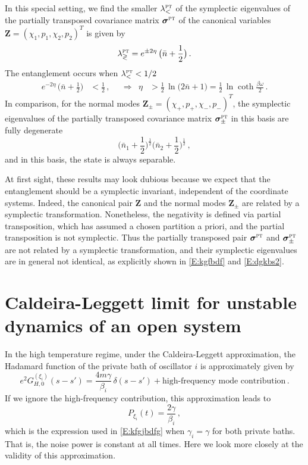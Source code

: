 \documentclass[11pt,a4paper]{article}
\begin{document}
In this special setting, we find the smaller $\lambda^{\textsc{pt}}_{<}$ of the symplectic eigenvalues of the partially transposed covariance matrix $\bm{\sigma}^{\textsc{pt}}$ of the canonical variables $\bm{Z}=(\chi_{1}, p_{1}, \chi_{2}, p_{2})^{T}$ is given by
\begin{equation}\label{E:kgfbdf}
	\lambda^{\textsc{pt}}_{\gtrless}=e^{\pm2\eta}\,\bigl(\bar{n}+\frac{1}{2}\bigr)\,.
\end{equation}
The entanglement occurs when $\lambda^{\textsc{pt}}_{<}<1/2$
\begin{align}
	e^{-2\eta}\,\bigl(\bar{n}+\frac{1}{2}\bigr)&<\frac{1}{2}\,,&&\Rightarrow&\eta&>\frac{1}{2}\,\ln\bigl(2\bar{n}+1\bigr)=\frac{1}{2}\,\ln\coth\frac{\beta\omega}{2}\,.
\end{align}
In comparison, for the normal modes $\bm{Z}_{\pm}=(\chi_{+}, p_{+}, \chi_{-}, p_{-})^{T}$, the symplectic eigenvalues of the partially transposed covariance matrix $\bm{\sigma}_{\pm}^{\textsc{pt}}$ in this basis are fully degenerate
\begin{equation}\label{E:dgkbs2}
	\bigl(\bar{n}_{1}+\frac{1}{2}\bigr)^{\frac{1}{2}}\bigl(\bar{n}_{2}+\frac{1}{2}\bigr)^{\frac{1}{2}}\,,
\end{equation}
and in this basis, the state is always separable.

At first sight, these results may look dubious because we expect that the entanglement should be a symplectic invariant, independent of the coordinate systems. Indeed, the canonical pair $\bm{Z}$ and the normal modes $\bm{Z}_\pm$ are related by a symplectic transformation. Nonetheless, the negativity is defined via partial transposition, which has assumed a chosen partition a priori, and the partial transposition is not symplectic. Thus the partially transposed pair $\bm{\sigma}^{\textsc{pt}}$ and $\bm{\sigma}_{\pm}^{\textsc{pt}}$ are not related by a symplectic transformation, and their symplectic eigenvalues are in general not identical, as explicitly shown in \eqref{E:kgfbdf} and \eqref{E:dgkbs2}. 



\section{Caldeira-Leggett limit for unstable dynamics of an open system}\label{S:gbdghf}


In the high temperature regime, {under} the Caldeira-Leggett approximation, the Hadamard function of the private bath of oscillator $i$ is approximately given by
\begin{equation}
	e^{2}G_{H,0}^{(\xi_{i})}(s-s')=\frac{4m\gamma}{\beta_{i}}\,\delta(s-s')+\text{high-frequency mode contribution}\,.
\end{equation}
If we ignore the high-frequency contribution, this approximation leads to
\begin{equation}
	P_{\xi_{i}}(t)=\frac{2\gamma}{\beta_{i}}\,,
\end{equation}
which is the expression used in \eqref{E:kfgjbdfg} when $\gamma_i=\gamma$ for both private baths. That is, the noise power is constant at all times. Here we look more closely at the validity of this approximation. 
\end{document}
